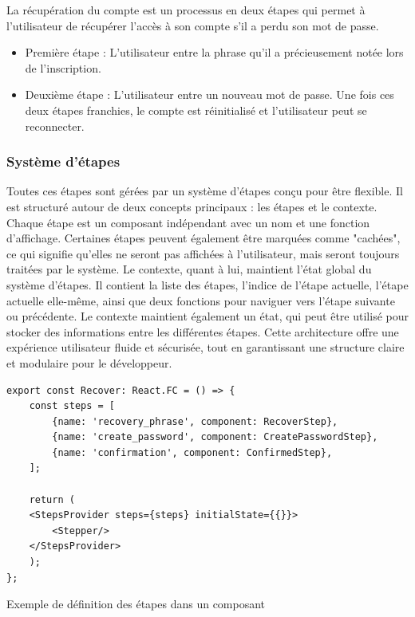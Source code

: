 La récupération du compte est un processus en deux étapes qui permet à l'utilisateur de récupérer l'accès à son compte s'il a perdu son mot de passe.

\begin{itemize}
    \item Première étape : L'utilisateur entre la phrase qu'il a précieusement notée lors de l'inscription.
    \item Deuxième étape : L'utilisateur entre un nouveau mot de passe. Une fois ces deux étapes franchies, le compte est réinitialisé et l'utilisateur peut se reconnecter.
\end{itemize}

\subsubsection{Système d'étapes}
Toutes ces étapes sont gérées par un système d'étapes conçu pour être flexible. Il est structuré autour de deux concepts principaux : les étapes et le contexte. Chaque étape est un composant indépendant avec un nom et une fonction d'affichage. Certaines étapes peuvent également être marquées comme "cachées", ce qui signifie qu'elles ne seront pas affichées à l'utilisateur, mais seront toujours traitées par le système. Le contexte, quant à lui, maintient l'état global du système d'étapes. Il contient la liste des étapes, l'indice de l'étape actuelle, l'étape actuelle elle-même, ainsi que deux fonctions pour naviguer vers l'étape suivante ou précédente. Le contexte maintient également un état, qui peut être utilisé pour stocker des informations entre les différentes étapes. Cette architecture offre une expérience utilisateur fluide et sécurisée, tout en garantissant une structure claire et modulaire pour le développeur.

\begin{listing}[H]
    \begin{verbatim}
export const Recover: React.FC = () => {
    const steps = [
        {name: 'recovery_phrase', component: RecoverStep},
        {name: 'create_password', component: CreatePasswordStep},
        {name: 'confirmation', component: ConfirmedStep},
    ];

    return (
    <StepsProvider steps={steps} initialState={{}}>
        <Stepper/>
    </StepsProvider>
    );
};
  \end{verbatim}
    \caption{Exemple de définition des étapes dans un composant}
\end{listing}

